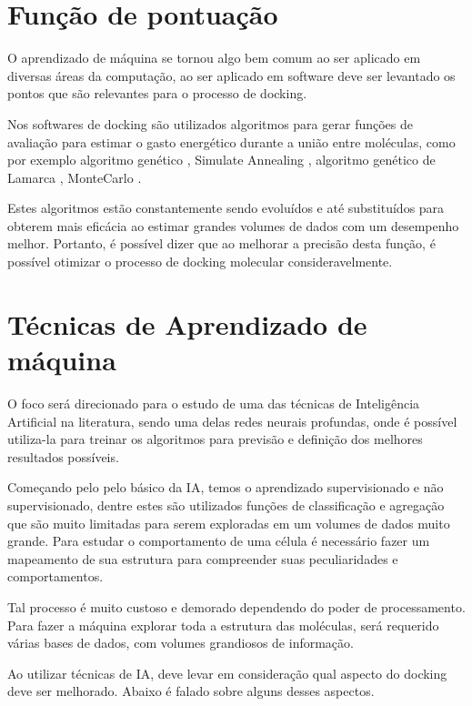 \documentclass[tcc, capa]{texucpel}
\begin{document}
\section{Função de pontuação}
O aprendizado de máquina se tornou algo bem comum ao ser aplicado em diversas áreas da computação, ao ser aplicado em software deve ser levantado os pontos que são relevantes para o processo de docking.

Nos softwares de docking são utilizados algoritmos para gerar funções de avaliação para estimar o gasto energético durante a união entre moléculas, como por exemplo algoritmo genético \cite{holland1975adaptation}, Simulate Annealing \cite{kirkpatrick1984optimization} ,  algoritmo genético de Lamarca \cite{morris1998automated},  MonteCarlo \cite{caflisch1992monte}.

Estes algoritmos estão constantemente sendo evoluídos e até substituídos para obterem mais eficácia ao estimar grandes volumes de dados com um desempenho melhor.
Portanto, é possível dizer que ao melhorar a precisão desta função, é possível otimizar o processo de docking molecular consideravelmente.

\section{Técnicas de Aprendizado de máquina }
O foco será direcionado para o estudo de uma das técnicas de Inteligência Artificial na literatura, sendo uma delas redes neurais profundas, onde é possível utiliza-la para treinar os algoritmos para previsão e definição dos melhores resultados possíveis. 

Começando pelo pelo básico da IA, temos o aprendizado supervisionado e não supervisionado, dentre estes são utilizados funções de classificação e agregação que são muito limitadas para serem exploradas em um volumes de dados muito grande.
Para estudar o comportamento de uma célula é necessário fazer um mapeamento de sua estrutura para compreender suas peculiaridades e comportamentos. 

Tal processo é muito custoso e demorado dependendo do poder de processamento. 
Para fazer a máquina explorar toda a estrutura das moléculas, será requerido várias  bases de dados, com volumes grandiosos de informação. 

Ao utilizar técnicas de IA, deve levar em consideração qual aspecto do docking deve ser melhorado. Abaixo é falado sobre alguns desses aspectos.
\end{document}
